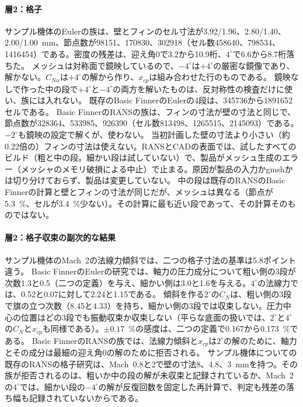 \documentclass[twocolumn]{labreport}
\newcommand{\CNa}{C_{N\alpha}}
\begin{document}
\paragraph{層2：格子}
サンプル機体のEulerの族は、壁とフィンのセル寸法が3.92/1.96、2.80/1.40、2.00/1.00~mm、節点数が98151、170830、302918（セル数458640、798534、1416454）である。密度の残差は、迎え角0で3.2から10.9桁、$4^\circ$で6.6から8.7桁落ちた。
メッシュは対称面で鏡映しているので、$-4^\circ$は$+4^\circ$の厳密な鏡像であり、解かない。$\CNa$は$+4^\circ$の解から作り、$x_{cp}$は組み合わせた行のものである。
鏡映なしで作った中の段で$+4^\circ$と$-4^\circ$の両方を解いたものは、反対称性の検査だけに使い、族には入れない。
既存のBasic FinnerのEulerの4段は、345736から1891652セルである。
Basic FinnerのRANSの族は、フィンの寸法が壁の寸法と同じで、節点数が328364、533985、926390（セル数813498、1265515、2145093）である。$-2^\circ$も鏡映の設定で解くが、使わない。
当初計画した壁の寸法より小さい（約0.22倍の）フィンの寸法は使えない。RANSとCADの表面では、試したすべてのビルド（粗と中の段。細かい段は試していない）で、製品がメッシュ生成のエラー（メッシャのメモリ破損による中止）で止まる。原因が製品の入力かgmshかは切り分けておらず、製品は変更していない。
中の段は既存のRANSのBasic Finnerの計算と壁とフィンの寸法が同じだが、メッシュは異なる（節点が5.3~\%、セルが3.4~\%少ない）。その計算に最も近い段であって、その計算そのものではない。

\paragraph{層2：格子収束の副次的な結果}
サンプル機体のMach~2の法線力傾斜では、二つの格子寸法の基準は5.8ポイント違う。
Basic FinnerのEulerの研究では、軸力の圧力成分について粗い側の3段が次数1.3と0.5（二つの定義）を与え、細かい側は3.0と1.6を与える。$4^\circ$の法線力では、0.52と0.07に対して2.24と1.15である。
傾斜を作る$2^\circ$の$C_N$は、粗い側の3段で旗の立つ次数（8.45と4.33）を持ち、細かい側の3段では収束しない。圧力中心の位置はどの3段でも振動収束か収束しない（平らな底面の扱いでは、$2^\circ$と$4^\circ$の$C_N$と$x_{cp}$も同様である）。$\pm0.17$~\%の感度は、二つの定義で0.167から0.173~\%である。
Basic FinnerのRANSの族では、法線力傾斜と$x_{cp}$は$2^\circ$の解のために、軸力とその成分は最細の迎え角0の解のために拒否される。
サンプル機体についての既存のRANSの格子研究は、Mach~0.8と2で壁の寸法8、4.8、3~mmを持つ。その族が拒否されるのは、粗いか中の段の解が未収束と記録されているか、Mach~2の$4^\circ$では、細かい段の$-4^\circ$の解が反復回数を固定した再計算で、判定も残差の落ち幅も記録されていないからである。
\end{document}
